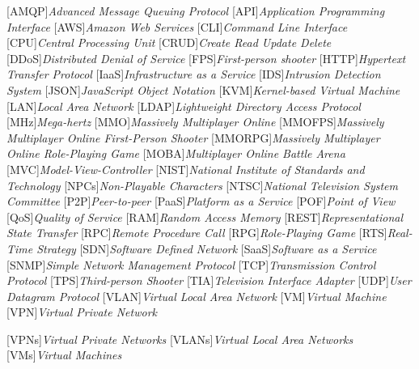 \begin{acronym}[]
	[AMQP]{{\it Advanced Message Queuing Protocol}}
	[API]{{\it Application Programming Interface}}
  [AWS]{{\it Amazon Web Services}}
	[CLI]{{\it Command Line Interface}}
	[CPU]{{\it Central Processing Unit}}
	[CRUD]{{\it Create Read Update Delete}}
	[DDoS]{{\it Distributed Denial of Service}}
	[FPS]{{\it First-person shooter}}
	[HTTP]{{\it Hypertext Transfer Protocol}}
	[IaaS]{{\it Infrastructure as a Service}}
  [IDS]{{\it Intrusion Detection System}}
	[JSON]{{\it JavaScript Object Notation}}
	[KVM]{{\it Kernel-based Virtual Machine}}
	[LAN]{{\it Local Area Network}}
  [LDAP]{{\it Lightweight Directory Access Protocol}}
	[MHz]{{\it Mega-hertz}}
	[MMO]{{\it Massively Multiplayer Online}}
	[MMOFPS]{{\it Massively Multiplayer Online First-Person Shooter}}
	[MMORPG]{{\it Massively Multiplayer Online Role-Playing Game}}
	[MOBA]{{\it Multiplayer Online Battle Arena}}
	[MVC]{{\it Model-View-Controller}}
	[NIST]{{\it National Institute of Standards and Technology}}
	[NPCs]{{\it Non-Playable Characters}}
	[NTSC]{{\it National Television System Committee}}
	[P2P]{{\it Peer-to-peer}}
	[PaaS]{{\it Platform as a Service}}
	[POF]{{\it Point of View}}
	[QoS]{{\it Quality of Service}}
	[RAM]{{\it Random Access Memory}}
	[REST]{{\it Representational State Transfer}}
	[RPC]{{\it Remote Procedure Call}}
	[RPG]{{\it Role-Playing Game}}
	[RTS]{{\it Real-Time Strategy}}
	[SDN]{{\it Software Defined Network}}
	[SaaS]{{\it Software as a Service}}
	[SNMP]{{\it Simple Network Management Protocol}}
	[TCP]{{\it Transmission Control Protocol}}
	[TPS]{{\it Third-person Shooter}}
	[TIA]{{\it Television Interface Adapter}}
	[UDP]{{\it User Datagram Protocol}}
	[VLAN]{{\it Virtual Local Area Network}}
	[VM]{{\it Virtual Machine}}
	[VPN]{{\it Virtual Private Network}}



	[VPNs]{{\it Virtual Private Networks}}
	[VLANs]{{\it Virtual Local Area Networks}}
	[VMs]{{\it Virtual Machines}}
\end{acronym}

